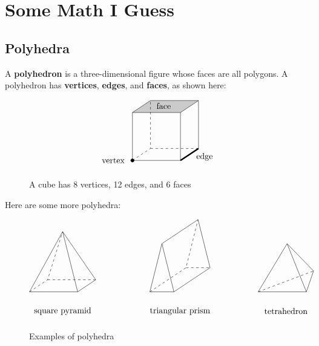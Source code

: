 \documentclass[final]{ukthesis} %
\begin{document}
\copyrightnotice %


\chapter{Some Math I Guess}

\section{Polyhedra}

A \textbf{polyhedron} is a three-dimensional figure whose faces are all polygons. A polyhedron has \textbf{vertices}, \textbf{edges}, and \textbf{faces}, as shown here:

\begin{figure}[h]
$$\begin{tikzpicture}
	\draw [dashed] (0, 0) -- (0.75, 0.5) -- (0.75, 2.5);
	\draw [dashed] (0.75, 0.5) -- (2.75, 0.5);
	\path[fill=black, opacity=0.2] (0, 2) -- (2, 2) -- (2.75, 2.5) -- (0.75, 2.5) -- (0, 2);
	\draw (0, 0) -- (2, 0) -- (2, 2) -- (0, 2) -- (0, 0);
	\draw (0, 2) -- (0.75, 2.5) -- (2.75, 2.5) -- (2, 2);
	\draw [line width=0.6mm] (2, 0) -- (2.75, 0.5);
	\draw (2.75, 0.5) -- (2.75, 2.5);
	\filldraw (0, 0) circle (2pt);
	\node at (-0.8, 0) {vertex};
	\node at (3, 0.15) {edge};
	\node at (1.3, 2.275) {face};
\end{tikzpicture}$$
\caption{A cube has 8 vertices, 12 edges, and 6 faces}
\end{figure}

Here are some more polyhedra:

\begin{figure}[h]
$$\begin{tikzpicture}
	\draw [dashed] (0, 0) -- (0.75, 0.5) -- (1.375, 2.5);
	\draw [dashed] (0.75, 0.5) -- (2.75, 0.5);
	\draw (2, 0) -- (0, 0) -- (1.375, 2.5) -- (2, 0) -- (2.75, 0.5) -- (1.375, 2.5);

	\draw [dashed] (5, 0) -- (6.5, 1) -- (7, 3);
	\draw [dashed] (6.5, 1) -- (7.5, 1);
	\draw (6, 0) -- (5, 0) -- (5.5, 2) -- (7, 3) -- (7.5, 1) -- (6, 0) -- (5.5, 2);

	\draw [dashed] (9.5, 0) -- (11.799, 0.866);
	\draw (10.7, 2) -- (9.5, 0) -- (11.5, 0) -- (11.799, 0.866) -- (10.7, 2) -- (11.5, 0);

	\node at (1.375, -0.8) {square pyramid};
	\node at (6.25, -0.8) {triangular prism};
	\node at (10.65, -0.8) {tetrahedron};
\end{tikzpicture}$$
\caption{Examples of polyhedra}
\end{figure}
\end{document}
